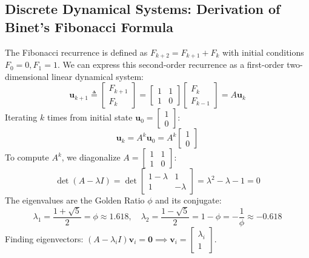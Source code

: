\subsection{Discrete Dynamical Systems: Derivation of Binet's Fibonacci Formula}
The Fibonacci recurrence is defined as $F_{k+2} = F_{k+1} + F_k$ with initial conditions $F_0 = 0, F_1 = 1$.
We can express this second-order recurrence as a first-order two-dimensional linear dynamical system:
\begin{equation}
\mathbf{u}_{k+1} \triangleq \begin{bmatrix} F_{k+1} \\ F_k \end{bmatrix} = \begin{bmatrix} 1 & 1 \\ 1 & 0 \end{bmatrix} \begin{bmatrix} F_k \\ F_{k-1} \end{bmatrix} = A \mathbf{u}_k
\label{eq:fib_dyn}
\end{equation}
Iterating $k$ times from initial state $\mathbf{u}_0 = \begin{bmatrix} 1 \\ 0 \end{bmatrix}$:
\begin{equation}
\mathbf{u}_k = A^k \mathbf{u}_0 = A^k \begin{bmatrix} 1 \\ 0 \end{bmatrix}
\end{equation}
To compute $A^k$, we diagonalize $A = \begin{bmatrix} 1 & 1 \\ 1 & 0 \end{bmatrix}$:
\begin{equation}
\det(A - \lambda I) = \det\begin{bmatrix} 1 - \lambda & 1 \\ 1 & -\lambda \end{bmatrix} = \lambda^2 - \lambda - 1 = 0
\end{equation}
The eigenvalues are the Golden Ratio $\phi$ and its conjugate:
\begin{equation}
\lambda_1 = \frac{1 + \sqrt{5}}{2} = \phi \approx 1.618, \quad \lambda_2 = \frac{1 - \sqrt{5}}{2} = 1 - \phi = -\frac{1}{\phi} \approx -0.618
\end{equation}
Finding eigenvectors: $(A - \lambda_i I)\mathbf{v}_i = \mathbf{0} \implies \mathbf{v}_i = \begin{bmatrix} \lambda_i \\ 1 \end{bmatrix}$.
